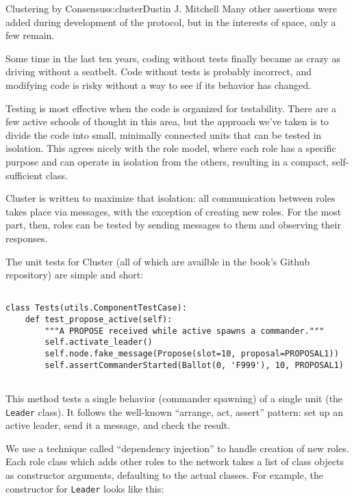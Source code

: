 \begin{aosachapter}{Clustering by Consensus}{s:cluster}{Dustin J. Mitchell}
Many other assertions were added during development of the protocol, but
in the interests of space, only a few remain.

\label{testing}

Some time in the last ten years, coding without tests finally became as
crazy as driving without a seatbelt. Code without tests is probably
incorrect, and modifying code is risky without a way to see if its
behavior has changed.

Testing is most effective when the code is organized for testability.
There are a few active schools of thought in this area, but the approach
we've taken is to divide the code into small, minimally connected units
that can be tested in isolation. This agrees nicely with the role model,
where each role has a specific purpose and can operate in isolation from
the others, resulting in a compact, self-sufficient class.

Cluster is written to maximize that isolation: all communication between
roles takes place via messages, with the exception of creating new
roles. For the most part, then, roles can be tested by sending messages
to them and observing their responses.

\label{unit-testing}

The unit tests for Cluster (all of which are availble in the book's
Github repository) are simple and short:

\begin{verbatim}

class Tests(utils.ComponentTestCase):
    def test_propose_active(self):
        """A PROPOSE received while active spawns a commander."""
        self.activate_leader()
        self.node.fake_message(Propose(slot=10, proposal=PROPOSAL1))
        self.assertCommanderStarted(Ballot(0, 'F999'), 10, PROPOSAL1)
    
\end{verbatim}

This method tests a single behavior (commander spawning) of a single
unit (the \texttt{Leader} class). It follows the well-known ``arrange,
act, assert'' pattern: set up an active leader, send it a message, and
check the result.

\label{dependency-injection}

We use a technique called ``dependency injection'' to handle creation of
new roles. Each role class which adds other roles to the network takes a
list of class objects as constructor arguments, defaulting to the actual
classes. For example, the constructor for \texttt{Leader} looks like
this:


\end{aosachapter}
